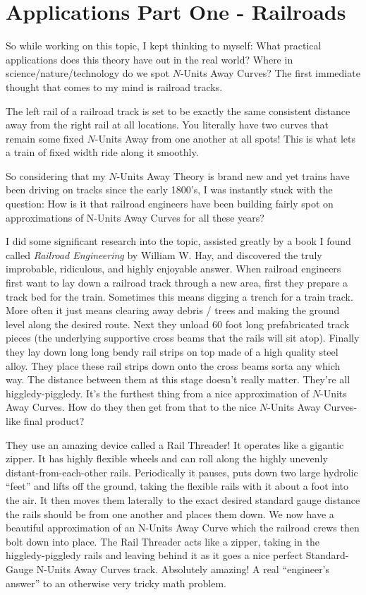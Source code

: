 \section{Applications Part One - Railroads}

So while working on this topic, I kept thinking to myself: What practical applications does this theory have out in the real world? Where in science/nature/technology do we spot $N$-Units Away Curves? The first immediate thought that comes to my mind is railroad tracks.

The left rail of a railroad track is set to be exactly the same consistent distance away from the right rail at all locations. You literally have two curves that remain some fixed $N$-Units Away from one another at all spots! This is what lets a train of
fixed width ride along it smoothly.

So considering that my $N$-Units Away Theory is brand new and yet trains have been
driving on tracks since the early 1800's, I was instantly stuck with the question: How is it that railroad engineers have been building fairly spot on approximations of N-Units Away Curves for all these years?

I did some significant research into the topic, assisted greatly by a book I found called \textit{Railroad Engineering} by William W. Hay, and discovered the truly improbable, ridiculous, and highly enjoyable answer. When railroad engineers first want to lay down a railroad track through a new area, first they prepare a track bed for the train. Sometimes this means digging a trench for a train track. More often it just means clearing away debris / trees and making the ground level along the desired route. Next they unload 60 foot long prefabricated track pieces (the underlying supportive cross beams that the rails will sit atop). Finally they lay down long long bendy rail strips on top made of a high quality steel alloy. They place these rail strips down onto the cross beams sorta any which way. The distance between them at this stage doesn't really matter. They’re all higgledy-piggledy. It’s the furthest thing from a nice approximation of $N$-Units Away Curves. How do they then get from that to the nice $N$-Units Away Curves-like final product?

They use an amazing device called a Rail Threader! It operates like a gigantic zipper. It has highly flexible wheels and can roll along the highly unevenly distant-from-each-other rails. Periodically it pauses, puts down two large hydrolic “feet” and lifts off the ground, taking the flexible rails with it about a foot into the air. It then moves them laterally to the exact desired standard gauge distance the rails should be from one another and places them down. We now have a beautiful approximation of an N-Units Away Curve which the railroad crews then bolt down into place. The Rail Threader acts like a zipper, taking in the higgledy-piggledy rails and leaving behind it as it goes a nice perfect Standard-Gauge N-Units Away Curves track. Absolutely amazing! A real “engineer’s answer” to an otherwise very tricky math problem.

